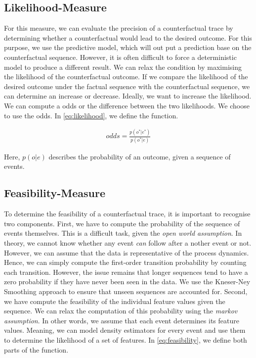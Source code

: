 \documentclass[./../../paper.tex]{subfiles}
\begin{document}
\subsection{Likelihood-Measure}
For this measure, we can evaluate the precision of a counterfactual trace by determining whether a counterfactual would lead to the desired outcome. For this purpose, we use the predictive model, which will out put a prediction base on the counterfactual sequence. However, it is often difficult to force a deterministic model to produce a different result. We can relax the condition by maximising the likelihood of the counterfactual outcome. If we compare the likelihood of the desired outcome under the factual sequence with the counterfactual sequence, we can determine an increase or decrease. Ideally, we want to increase the likelihood. We can compute a odds or the difference between the two likelihoods. We choose to use the odds. In \autoref{eq:likelihood}, we define the function.

\begin{align}
    \label{eq:likelihood}
    odds = \frac{p(o^*|e^*)}{p(o^*|e)}
\end{align}

Here, $p(o|e)$ describes the probability of an outcome, given a sequence of events.

\subsection{Feasibility-Measure}
To determine the feasibility of a counterfactual trace, it is important to recognise two components. First, we have to compute the probability of the sequence of events themselves. This is a difficult task, given the \emph{open world assumption}. In theory, we cannot know whether any event \emph{can} follow after a nother event or not. However, we can assume that the data is representative of the process dynamics. Hence, we can simply compute the first-order transition probability by counting each transition. However, the issue remains that longer sequences tend to have a zero probability if they have never been seen in the data. We use the Kneser-Ney Smoothing\needscite{} approach to ensure that unseen sequences are accounted for. Second, we have compute the feasibility of the individual feature values given the sequence. We can relax the computation of this probability using the \emph{markov assumption}. In other words, we assume that each event determines its feature values. Meaning, we can model density estimators for every event and use them to determine the likelihood of a set of features. In \autoref{eq:feasibility}, we define both parts of the function.
\end{document}
